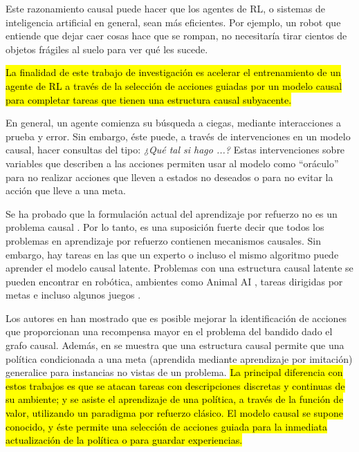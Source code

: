     






Este razonamiento causal puede hacer 
que los agentes de RL, o sistemas de inteligencia artificial en general, 
sean más eficientes.
Por ejemplo, un robot que entiende que dejar caer cosas hace que se rompan, no necesitaría tirar cientos de objetos frágiles al suelo para ver qué les sucede.





\hl{La finalidad de este trabajo de investigación es 
acelerar el entrenamiento de un agente de RL
a través de la selección de acciones guiadas por un 
modelo causal para completar tareas que tienen una
estructura causal subyacente.}

En general, un agente comienza su búsqueda a ciegas,
mediante interacciones a prueba y error.
Sin embargo, éste puede, a través de intervenciones
en un modelo causal, hacer consultas del tipo: \textit{¿Qué tal si hago ...?} Estas intervenciones sobre variables 
que describen a las acciones permiten usar al modelo
como ``oráculo'' para no realizar acciones que lleven
a estados no deseados o para no evitar la acción que
lleve a una meta.

Se ha probado que la formulación actual del aprendizaje
por refuerzo no es un problema causal \cite{gonzalezsoto2019reinforcement}.
Por lo tanto, es una suposición fuerte 
decir que todos los problemas 
en aprendizaje por refuerzo contienen mecanismos causales. 
Sin embargo, hay tareas en las
que un experto o incluso el mismo algoritmo puede
aprender el modelo causal latente.
Problemas con una estructura causal latente
se pueden encontrar en robótica, ambientes como Animal AI \cite{beyret2019animalai}, 
tareas dirigidas por metas \cite{nair2019causal} e
incluso algunos juegos \cite{madumal2019explainable}.



Los autores en \cite{lattimore2016causal} han mostrado
que es posible mejorar la identificación de acciones que proporcionan una recompensa mayor en
el problema del bandido dado el grafo causal. Además, en \cite{nair2019causal}
se muestra que una estructura causal permite que una política condicionada a una
meta (aprendida mediante aprendizaje por imitación) generalice para instancias no vistas de 
un problema. 
\hl{La principal diferencia con estos trabajos es que se atacan tareas con descripciones discretas y continuas de su ambiente; y se asiste el aprendizaje de una política, a través de la función de valor, utilizando un paradigma por refuerzo clásico.
El modelo causal se supone conocido, y éste permite una selección de acciones 
guiada para la inmediata actualización de la política o para guardar experiencias.}

